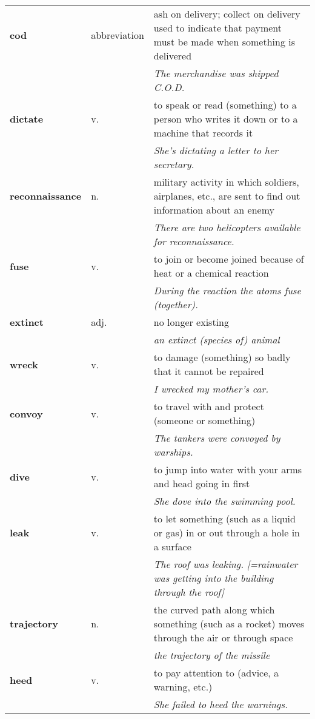 \documentclass[a4paper]{article}
\begin{document}
\begin{longtable}{llp{11cm}}
\textbf{cod} & abbreviation &  ash on delivery; collect on delivery used to indicate that payment must be made when something is delivered \\
 & & \textit{The merchandise was shipped C.O.D.}\\[0.08cm]
\textbf{dictate} & v. &  to speak or read (something) to a person who writes it down or to a machine that records it \\
 & & \textit{She's dictating a letter to her secretary.}\\[0.08cm]
\textbf{reconnaissance} & n. &  military activity in which soldiers, airplanes, etc., are sent to find out information about an enemy \\
 & & \textit{There are two helicopters available for reconnaissance.}\\[0.08cm]
\textbf{fuse} & v. &  to join or become joined because of heat or a chemical reaction \\
 & & \textit{During the reaction the atoms fuse (together).}\\[0.08cm]
\textbf{extinct} & adj. &  no longer existing \\
 & & \textit{an extinct (species of) animal}\\[0.08cm]
\textbf{wreck} & v. &  to damage (something) so badly that it cannot be repaired \\
 & & \textit{I wrecked my mother's car.}\\[0.08cm]
\textbf{convoy} & v. &  to travel with and protect (someone or something) \\
 & & \textit{The tankers were convoyed by warships.}\\[0.08cm]
\textbf{dive} & v. &  to jump into water with your arms and head going in first \\
 & & \textit{She dove into the swimming pool.}\\[0.08cm]
\textbf{leak} & v. &  to let something (such as a liquid or gas) in or out through a hole in a surface \\
 & & \textit{The roof was leaking. [=rainwater was getting into the building through the roof]}\\[0.08cm]
\textbf{trajectory} & n. &  the curved path along which something (such as a rocket) moves through the air or through space \\
 & & \textit{the trajectory of the missile}\\[0.08cm]
\textbf{heed} & v. &  to pay attention to (advice, a warning, etc.) \\
 & & \textit{She failed to heed the warnings.}\\[0.08cm]

\end{longtable}
\end{document}
